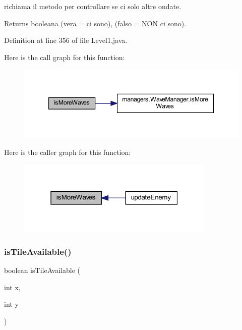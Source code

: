 richiama il metodo per controllare se ci solo altre ondate. 

\begin{DoxyReturn}{Returns}
booleana (vera = ci sono), (falso = N\+ON ci sono). 
\end{DoxyReturn}


Definition at line 356 of file Level1.\+java.

Here is the call graph for this function\+:
\nopagebreak
\begin{figure}[H]
\begin{center}
\leavevmode
\includegraphics[width=347pt]{classscenes_1_1_level1_a999f12a033f49f299ad7f55bcae24447_cgraph}
\end{center}
\end{figure}
Here is the caller graph for this function\+:\nopagebreak
\begin{figure}[H]
\begin{center}
\leavevmode
\includegraphics[width=268pt]{classscenes_1_1_level1_a999f12a033f49f299ad7f55bcae24447_icgraph}
\end{center}
\end{figure}
\mbox{\label{classscenes_1_1_level1_aaeac2ee6b3a920a21928ee7b3dc8e7a9}} 
\subsubsection{\texorpdfstring{is\+Tile\+Available()}{isTileAvailable()}}
{\footnotesize\ttfamily boolean is\+Tile\+Available (\begin{DoxyParamCaption}\item[{int}]{x,  }\item[{int}]{y }\end{DoxyParamCaption})\hspace{0.3cm}{\ttfamily [private]}}




